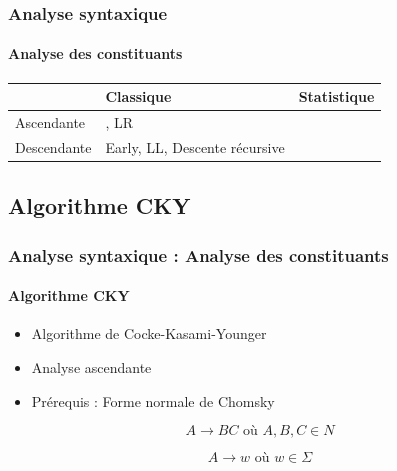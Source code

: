 \documentclass[xcolor=table]{beamer}
\begin{document}
\begin{frame}
\frametitle{Analyse syntaxique}
\framesubtitle{Analyse des constituants}


\begin{center}
	\begin{tabular}{|p{}|p{}|p{}|}
	\hline
	& Classique & Statistique \\
	\hline
	Ascendante & \optword{CKY}, LR & \optword{CKY probabiliste}\\
	\hline
	Descendante & Early, LL, Descente récursive  & \\
	\hline
\end{tabular}
\end{center}

\end{frame}

\subsection{Algorithme CKY}

\begin{frame}
\frametitle{Analyse syntaxique : Analyse des constituants}
\framesubtitle{Algorithme CKY}

\begin{itemize}
	\item Algorithme de Cocke-Kasami-Younger
	\item Analyse ascendante
	\item Prérequis : Forme normale de Chomsky
\end{itemize}

\begin{definition}
	\[
	A \rightarrow  B C \text{ où } A, B, C \in N
	\]
	
	\[
	A \rightarrow w \text{ où } w \in \Sigma
	\]
\end{definition}

\end{frame}
\end{document}
